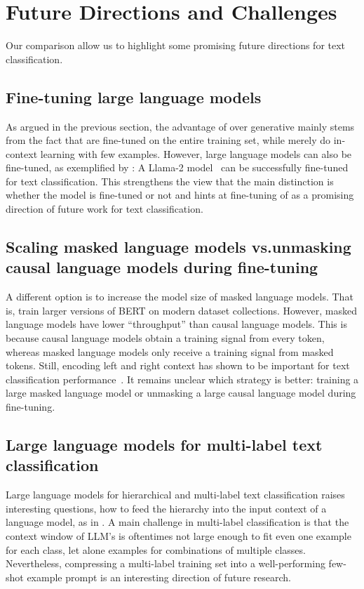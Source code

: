 \section{Future Directions and Challenges}\label{sec:future}
Our comparison allow us to highlight some promising future directions for text classification.

\subsection{Fine-tuning large language models}
As argued in the previous section, the advantage of \SLMs over generative \LLMs mainly stems from the fact that \SLMs are fine-tuned on the entire training set, while \GenLMs merely do in-context learning with few examples. 
However, large language models can also be fine-tuned, as exemplified by \cite{li2023label}: A Llama-2 model~\cite{touvronLlamaOpenFoundation2023}  can be successfully fine-tuned for text classification.
This strengthens the view that the main distinction is whether the model is fine-tuned or not and hints at fine-tuning of \GenLMs as a promising direction of future work for text classification.

\subsection{Scaling masked language models vs.\@ unmasking causal language models during fine-tuning}
A different option is to increase the model size of masked language models. That is, train larger versions of BERT on modern dataset collections. However, masked language models have lower ``throughput'' than causal language models. This is because causal language models obtain a training signal from every token, whereas masked language models only receive a training signal from masked tokens. Still, encoding left and right context has shown to be important for text classification performance~\cite{li2023label}.
It remains unclear which strategy is better: training a large masked language model or unmasking a large causal language model during fine-tuning.

\subsection{Large language models for multi-label text classification}

Large language models for hierarchical and multi-label text classification raises interesting questions, how to feed the hierarchy into the input context of a language model, \eg as in \cite{fatemi2024talk}.
A main challenge in multi-label classification is that the context window of LLM's is oftentimes not large enough to fit even one example for each class, let alone examples for combinations of multiple classes.
Nevertheless, compressing a multi-label training set into a well-performing few-shot example prompt is an interesting direction of future research.


